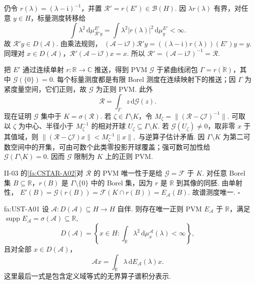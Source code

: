 \begin{FAProof}
仍令 \(\displaystyle r(\lambda)=(\lambda-\mathrm{i})^{-1}\)，并置 \(\displaystyle\mathcal R'=r(E')\in\mathcal B(H)\). 因 \(\displaystyle\lambda r(\lambda)\) 有界，对任意 \(\displaystyle y\in H\)，标量测度转移给
\[
\int\lambda^2\,\mathrm{d}\mu_{\mathcal R'y}^{E'}
=
\int\lambda^2|r(\lambda)|^2\,\mathrm{d}\mu_y^{E'}<\infty.
\]
故 \(\displaystyle\mathcal R'y\in D(\mathcal A)\). 由乘法规则，
\(\displaystyle (\mathcal A-\mathrm{i}\mathcal I)\mathcal R'y = ((\lambda-\mathrm{i})r(\lambda))(E')y =y.\)
同理对 \(\displaystyle x\in D(\mathcal A)\)，\(\displaystyle\mathcal R'(\mathcal A-\mathrm{i}\mathcal I)x=x\). 所以
\(\displaystyle \mathcal R'= (\mathcal A-\mathrm{i}\mathcal I)^{-1}=\mathcal R.\)

把 \(\displaystyle E'\) 通过连续单射 \(\displaystyle r:\mathbb R\to\mathbb C\) 推送，得到 PVM \(\displaystyle\mathcal G\) 于紧曲线闭包 \(\displaystyle\Gamma=\overline{r(\mathbb R)}\)，其中 \(\displaystyle\mathcal G(\{0\})=0\). 每个标量测度都是有限 Borel 测度在连续映射下的推送；因 \(\displaystyle\Gamma\) 为紧度量空间，它们正则，故 \(\displaystyle\mathcal G\) 为正则 PVM. 此外
\[
\mathcal R=\int_\Gamma z\,\mathrm{d}\mathcal G(z).
\]
现在证明 \(\displaystyle\mathcal G\) 集中于 \(\displaystyle K=\sigma(\mathcal R)\). 若 \(\displaystyle\zeta\in\Gamma\setminus K\)，令 \(\displaystyle M_\zeta=\|(\mathcal R-\zeta\mathcal I)^{-1}\|\). 可取以 \(\displaystyle\zeta\) 为中心、半径小于 \(\displaystyle M_\zeta^{-1}\) 的相对开球 \(\displaystyle U_\zeta\subseteq\Gamma\setminus K\). 若 \(\displaystyle\mathcal G(U_\zeta)\neq0\)，取非零 \(\displaystyle x\) 于其值域，则
\(\displaystyle \|(\mathcal R-\zeta\mathcal I)x\|<M_\zeta^{-1}\|x\|,\)
与逆算子估计矛盾. 因 \(\displaystyle\Gamma\setminus K\) 为第二可数空间中的开集，可由可数个此类零投影开球覆盖；强可数可加性给 \(\displaystyle\mathcal G(\Gamma\setminus K)=0\). 因而 \(\displaystyle\mathcal G\) 限制为 \(\displaystyle K\) 上的正则 PVM.

II-03 的\autoref{fa:CSTAR-A02}对 \(\displaystyle\mathcal R\) 的 PVM 唯一性于是给
\(\displaystyle \mathcal G=\mathcal F\)
于 \(\displaystyle K\). 对任意 Borel 集 \(\displaystyle B\subseteq\mathbb R\)，\(\displaystyle r(B)\) 是 \(\displaystyle\Gamma\setminus\{0\}\) 中的 Borel 集，因为 \(\displaystyle r\) 是 \(\displaystyle\mathbb R\) 到其像的同胚. 由单射性，
\(\displaystyle E'(B)=\mathcal G(r(B))=\mathcal F(K\cap r(B))=E_{\mathcal A}(B).\)
故谱测度唯一.
\hfill\(\square\)
\end{FAProof}

\begin{FATheorem}[A][无界自伴算子谱定理]{fa:UST-A01}
设
\(\displaystyle \mathcal A:D(\mathcal A)\subseteq H\to H\)
自伴. 则存在唯一正则 PVM \(\displaystyle E_{\mathcal A}\) 于 \(\displaystyle\mathbb R\)，满足
\(\displaystyle \operatorname{supp}E_{\mathcal A} = \sigma(\mathcal A) \subseteq \mathbb R,\)
\[
D(\mathcal A)
=
\left\{
 x\in H:
 \int_{\mathbb R}\lambda^2\,\mathrm{d}\mu_x^{\mathcal A}(\lambda)<\infty
\right\},
\]
且对全部 \(\displaystyle x\in D(\mathcal A)\)，
\[
\mathcal Ax
=
\int_{\mathbb R}\lambda\,\mathrm{d}E_{\mathcal A}(\lambda)x.
\]
这里最后一式是包含定义域等式的无界算子谱积分表示.
\end{FATheorem}


